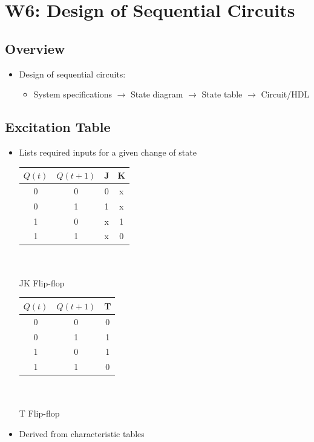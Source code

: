 \documentclass[a4paper]{article}
\begin{document}
\newpage
\section{W6: Design of Sequential Circuits}
\subsection{Overview}
\begin{itemize}
\item Design of sequential circuits:
    \begin{itemize}[label=$\circ$]
        \item System specifications $\rightarrow$ State diagram $\rightarrow$ State table $\rightarrow$ Circuit/HDL
    \end{itemize}
\end{itemize}

\subsection{Excitation Table}
\begin{itemize}
    \item Lists required inputs for a given change of state\\
    \begin{minipage}{0.5\textwidth}
    \begin{table}[H]
    \centering
    \begin{tabular}{cc|cc}
        $Q(t)$ & $Q(t+1)$ & J & K \\ \hline
        0 & 0 & 0 & x \\
        0 & 1 & 1 & x \\
        1 & 0 & x & 1 \\
        1 & 1 & x & 0
    \end{tabular}\mbox{}\\
    \mbox{}\\
    JK Flip-flop
    \end{table}
    \end{minipage}
    \begin{minipage}{0.5\textwidth}
    \begin{table}[H]
    \centering
    \begin{tabular}{cc|c}
        $Q(t)$ & $Q(t+1)$ & T \\ \hline
        0 & 0 & 0 \\
        0 & 1 & 1 \\
        1 & 0 & 1 \\
        1 & 1 & 0
    \end{tabular}\mbox{}\\
    \mbox{}\\
    T Flip-flop
    \end{table}
    \end{minipage}
    \item Derived from characteristic tables
\end{itemize}
\end{document}
